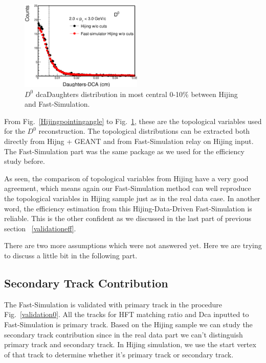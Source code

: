 \documentclass[a4paper]{article}
\begin{document}
\begin{figure}[htbp]
\centering
\includegraphics[keepaspectratio,width=0.52\textwidth]{fig/HijingdcaDaughters.eps}
\caption{$D^0$ dcaDaughters distribution in most central 0-10\% between Hijing and Fast-Simulation.}
\label{HijingdcaDaughters}
\end{figure}

From Fig.~\ref{Hijingpointingangle} to Fig.~\ref{HijingdcaDaughters}, these are the topological variables used for the $D^0$ reconstruction. The topological distributions can be extracted both directly from Hijng + GEANT and from Fast-Simulation relay on Hijing input. The Fast-Simulation part was the same package as we used for the efficiency study before.

As seen, the comparison of topological variables from Hijing have a very good agreement, which means again our Fast-Simulation method can well reproduce the topological variables in Hijing sample just as in the real data case. In another word, the efficiency estimation from this Hijing-Data-Driven Fast-Simulation is reliable.  This is the other confident as we discussed in the last part of previous section ~\ref{validationeff}.


There are two more assumptions which were not answered yet. Here we are trying to discuss a little bit in the following part.

\subsection{\label{concern1} Secondary Track Contribution}

The Fast-Simulation is validated with primary track in the procedure Fig.~\ref{validation0}. All the tracks for HFT matching ratio and Dca inputted to Fast-Simulation is primary track. Based on the Hijing sample we can study the secondary track contribution since in the real data part we can't distinguish primary track and secondary track. In Hijing simulation, we use the start vertex of that track to determine whether it's primary track or secondary track.
\end{document}
